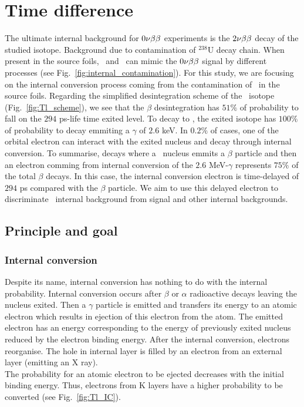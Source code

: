 \chapter{Time difference}
\label{ch:timediff}

The ultimate internal background for $0\nu\beta\beta$ experiments is the $2\nu\beta\beta$ decay of the studied isotope.
Background due to contamination of $^{238}$U decay chain.
When present in the source foils, \Tl\ and \Bi\ can mimic the $0\nu\beta\beta$ signal by different processes (see Fig.~\ref{fig:internal_contamination}).
For this study, we are focusing on the internal conversion process coming from the contamination of \Tl\ in the source foils.
Regarding the simplified desintegration scheme of the \Tl\ isotope (Fig.~\ref{fig:Tl_scheme}), we see that the $\beta$ desintegration has $51\%$ of probability to fall on the $294$ ps-life time exited level.
To decay to \Pb, the exited isotope has $100\%$ of probability to decay emmiting a $\gamma$ of $2.6$ keV.
In $0.2\%$ of cases, one of the orbital electron can interact with the exited nucleus and decay through internal conversion.
To summarise, decays where a \Tl\ nucleus emmits a $\beta$ particle and then an electron comming from internal conversion of the $2.6$ MeV-$\gamma$ represents $75\%$ of the total $\beta$ decays.
In this case, the internal conversion electron is time-delayed of $294$ ps compared with the $\beta$ particle.
We aim to use this delayed electron to discriminate \Tl\ internal background from signal and other internal backgrounds.

\section{Principle and goal}

\subsection{Internal conversion}
\label{subsec:IC}
Despite its name, internal conversion has nothing to do with the internal probability.
Internal conversion occurs after $\beta$ or $\alpha$ radioactive decays leaving the nucleus exited.
Then a $\gamma$ particle is emitted and transfers its energy to an atomic electron which results in ejection of this electron from the atom.
The emitted electron has an energy corresponding to the energy of previously exited nucleus reduced by the electron binding energy.
After the internal conversion, electrons reorganise.
The hole in internal layer is filled by an electron from an external layer (emitting an X ray).\\
The probability for an atomic electron to be ejected decreases with the initial binding energy.
Thus, electrons from K layers have a higher probability to be converted (see Fig.~\ref{fig:Tl_IC}).

